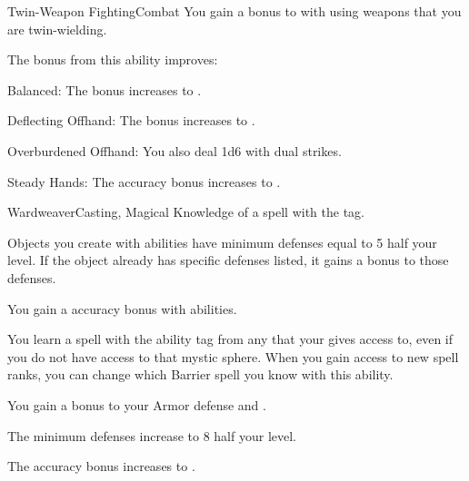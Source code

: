 \begin{feat}{Twin-Weapon Fighting}{Combat}
     You gain a  bonus to  with  using weapons that you are twin-wielding.

     The bonus from this ability improves:
    \begin{raggeditemize}
      \item Balanced: The bonus increases to .
      \item Deflecting Offhand: The bonus increases to .
      \item Overburdened Offhand: You also deal 1d6  with dual strikes.
      \item Steady Hands: The accuracy bonus increases to .
    \end{raggeditemize}
  \end{feat}

  \begin{magicalfeat}{Wardweaver}{Casting, Magical}
    \featpre Knowledge of a spell with the  tag.

     Objects you create with  abilities have minimum defenses equal to 5 \add half your level.
    If the object already has specific defenses listed, it gains a  bonus to those defenses.

     You gain a  accuracy bonus with \atBarrier abilities.

     You learn a spell with the  ability tag from any  that your  gives access to, even if you do not have access to that mystic sphere.
    When you gain access to new spell ranks, you can change which Barrier spell you know with this ability.

     You gain a  bonus to your Armor defense and .

     The minimum defenses increase to 8 \add half your level.

     The accuracy bonus increases to .
  \end{magicalfeat}

